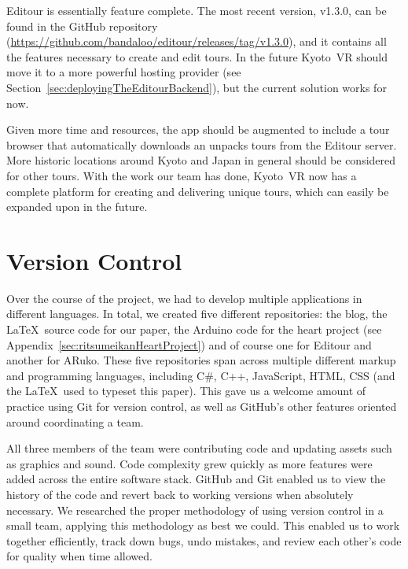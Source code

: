 \documentclass[a4paper, 10pt, american, titlepage]{article}
\begin{document}
Editour is essentially feature complete. The most recent version, v1.3.0, can be
found in the GitHub repository
(\url{https://github.com/bandaloo/editour/releases/tag/v1.3.0}), and it contains
all the features necessary to create and edit tours. In the future Kyoto~VR
should move it to a more powerful hosting provider (see
Section~\ref{sec:deployingTheEditourBackend}), but the current solution works
for now.

Given more time and resources, the app should be augmented to include a tour
browser that automatically downloads an unpacks tours from the Editour server.
More historic locations around Kyoto and Japan in general should be considered
for other tours. With the work our team has done, Kyoto~VR now has a complete
platform for creating and delivering unique tours, which can easily be expanded
upon in the future.

\clearpage

\begin{singlespace}
	\printbibliography
\end{singlespace}

\clearpage

\appendices

\section{Version Control}
\label{sec:versionControl}

Over the course of the project, we had to develop multiple applications in
different languages. In total, we created five different repositories: the blog,
the \LaTeX~source code for our paper, the Arduino code for the heart project
(see Appendix~\ref{sec:ritsumeikanHeartProject}) and of course one for Editour
and another for ARuko. These five repositories span across multiple different
markup and programming languages, including C\#, C++, JavaScript, HTML, CSS (and
the \LaTeX~used to typeset this paper). This gave us a welcome amount of
practice using Git for version control, as well as GitHub's other features
oriented around coordinating a team.

All three members of the team were contributing code and updating assets such as
graphics and sound. Code complexity grew quickly as more features were added
across the entire software stack. GitHub and Git enabled us to view the history
of the code and revert back to working versions when absolutely necessary. We
researched the proper methodology of using version control in a small team,
applying this methodology as best we could. This enabled us to work together
efficiently, track down bugs, undo mistakes, and review each other's code for
quality when time allowed.
\end{document}
